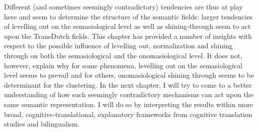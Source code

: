 Different (and sometimes seemingly contradictory) tendencies are thus at play here and seem to determine the structure of the semantic fields: larger tendencies of levelling out on the semasiological level as well as shining-through seem to act upon the TransDutch fields. This chapter has provided a number of insights with respect to the possible influence of levelling out, normalization and shining through on both the semasiological and the onomasiological level. It does not, however, explain why for some phenomena, levelling out on the semasiological level seems to prevail and for others, onomasiological shining through seems to be determinant for the clustering. In the next chapter, I will try to come to a better understanding of how such seemingly contradictory mechanisms can act upon the same semantic representation. I will do so by interpreting the results within more broad, cognitive-translational, explanatory frameworks from cognitive translation studies and bilingualism.
